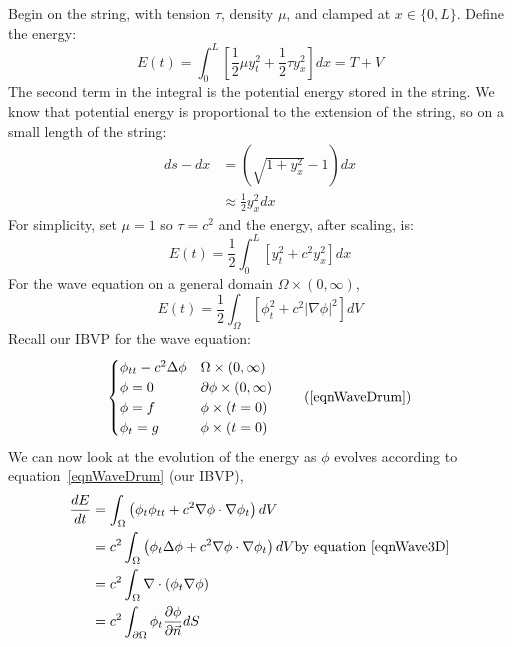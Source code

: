 \documentclass[../Main.tex]{subfiles}
\begin{document}
Begin on the string, with tension $\tau$, density $\mu$, and clamped at $x \in \{0, L\}$. Define the energy:
\begin{equation*}
    E(t) = \int_{0}^{L} \left[\frac12 \mu y_t^2 + \frac12 \tau y_x^2\right] dx = T + V
\end{equation*}
The second term in the integral is the potential energy stored in the string. We know that potential energy is proportional to the extension of the string, so on a small length of the string:
\begin{align*}
    ds - dx &= \left(\sqrt{1 + y_x^2} - 1\right) dx \\
    &\approx \frac{1}{2}y_x^2 dx
\end{align*}
For simplicity, set $\mu = 1$ so $\tau = c^2$ and the energy, after scaling, is:
\begin{equation*}
    E(t) = \frac12 \int_{0}^{L} \left[y_t^2 + c^2 y_x^2\right] dx
\end{equation*}
For the wave equation on a general domain $\Omega \times (0, \infty)$,
\begin{equation*}
    E(t) = \frac12 \int_{\Omega} \left[\phi_t^2 + c^2 |\nabla\phi|^2\right]dV
\end{equation*}
Recall our IBVP for the wave equation:
\begin{equation}
    \begin{cases}
        \phi_{tt} - c^2 \Delta \phi & \Omega \times (0, \infty) \\
        \phi = 0 & \partial \phi \times (0, \infty) \\
        \phi = f & \phi \times (t = 0) \\
        \phi_t = g & \phi \times (t = 0) \\
    \end{cases}
    \tag{\ref{eqnWaveDrum}}
\end{equation}
We can now look at the evolution of the energy as $\phi$ evolves according to equation~\ref{eqnWaveDrum} (our IBVP),
\begin{align*}
    \frac{dE}{dt} &= \int_{\Omega} \left(\phi_t \phi_{tt} + c^2 \nabla \phi \cdot \nabla \phi_t\right) dV \\
    &= c^2\int_{\Omega} \left(\phi_t \Delta \phi + c^2 \nabla \phi \cdot \nabla \phi_t\right) dV \text{by equation~\ref{eqnWave3D}} \\
    &= c^2 \int_{\Omega} \nabla \cdot \left(\phi_t\nabla \phi\right) \\
    &= c^2 \int_{\partial \Omega} \phi_t \frac{\partial \phi}{\partial \vec{n}} dS
\end{align*}
\end{document}
